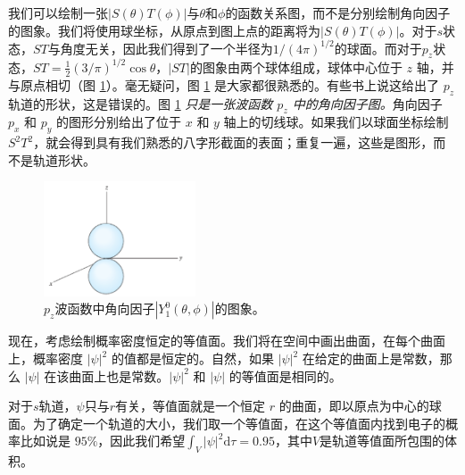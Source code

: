     我们可以绘制一张$\left|S\left(\theta\right)T\left(\phi\right)\right|$与$\theta$和$\phi$的函数关系图，而不是分别绘制角向因子的图象。我们将使用球坐标，从原点到图上点的距离将为$\left|S\left(\theta\right)T\left(\phi\right)\right|$。对于$s$状态，$ST$与角度无关，因此我们得到了一个半径为$1/\left(4\pi\right)^{1/2}$的球面。而对于$p_z$状态，$ST = \frac{1}{2}\left(3/\pi\right)^{1/2}\cos\theta$，$\left|ST\right|$的图象由两个球体组成，球体中心位于 $z$ 轴，并与原点相切（图 \ref{fig:6.11}）。毫无疑问，图 \ref{fig:6.11} 是大家都很熟悉的。有些书上说这给出了 $p_z$ 轨道的形状，这是错误的。图 \ref{fig:6.11} \textit{只是一张波函数 $p_z$ 中的角向因子图。}角向因子 $p_x$ 和 $p_y$ 的图形分别给出了位于 $x$ 和 $y$ 轴上的切线球。如果我们以球面坐标绘制 $S^2T^2$，就会得到具有我们熟悉的八字形截面的表面；重复一遍，这些是图形，而不是轨道形状。
    \begin{figure}[h!]
        \centering
        \includegraphics[width=0.4\textwidth]{Figures/6.11.png}
        \caption{
            $p_z$波函数中角向因子$\left|Y_1^0\left(\theta,\phi\right)\right|$的图象。
        }
        \label{fig:6.11}
    \end{figure}

    现在，考虑绘制概率密度恒定的等值面。我们将在空间中画出曲面，在每个曲面上，概率密度 $\left|\psi\right|^2$ 的值都是恒定的。自然，如果 $\left|\psi\right|^2$ 在给定的曲面上是常数，那么 $\left|\psi\right|$ 在该曲面上也是常数。$\left|\psi\right|^2$ 和 $\left|\psi\right|$ 的等值面是相同的。

    对于$s$轨道，$\psi$只与$r$有关，等值面就是一个恒定 $r$ 的曲面，即以原点为中心的球面。为了确定一个轨道的大小，我们取一个等值面，在这个等值面内找到电子的概率比如说是 $95\%$，因此我们希望$\int_{V}\left|\psi\right|^2\mathrm{d}\tau = 0.95$，其中$V$是轨道等值面所包围的体积。

